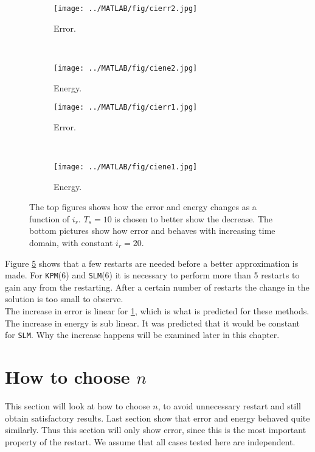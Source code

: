 \begin{figure}[H]
        \centering
        \begin{subfigure}[b]{0.45\textwidth}
                \texttt{[image: ../MATLAB/fig/cierr2.jpg]}
                \caption{ Error. }
                \label{fig:cierr2}
        \end{subfigure}
        ~
		\begin{subfigure}[b]{0.45\textwidth}
                \texttt{[image: ../MATLAB/fig/ciene2.jpg]}
                \caption{ Energy. }
                \label{fig:ciene2}
        \end{subfigure}    

        \begin{subfigure}[b]{0.45\textwidth}
                \texttt{[image: ../MATLAB/fig/cierr1.jpg]}
                \caption{ Error. }
                \label{fig:cierr1}
        \end{subfigure}
        ~
		\begin{subfigure}[b]{0.45\textwidth}
                \texttt{[image: ../MATLAB/fig/ciene1.jpg]}
                \caption{ Energy. }
                \label{fig:ciene1}
        \end{subfigure}
        \caption{ The top figures shows how the error and energy changes as a function of $i_r$. $T_s = 10$ is chosen to better show the decrease. The bottom pictures show how error and behaves with increasing time domain, with constant $i_r = 20$. }
        \label{fig:ci}
\end{figure}
Figure \ref{fig:ci} shows that a few restarts are needed before a better approximation is made. For \texttt{KPM}(6) and \texttt{SLM}(6) it is necessary to perform more than 5 restarts to gain any from the restarting. After a certain number of restarts the change in the solution is too small to observe.  \\
The increase in error is linear for \ref{fig:cierr2}, which is what is predicted for these methods. \\
The increase in energy is sub linear. It was predicted that it would be constant for \texttt{SLM}. Why the increase happens will be examined later in this chapter.

\section{How to choose $n$}%
\label{sec:resultat}
This section will look at how to choose $n$, to avoid unnecessary restart and still obtain satisfactory results. Last section show that error and energy behaved quite similarly. Thus this section will only show error, since this is the most important property of the restart. We assume that all cases tested here are independent.

